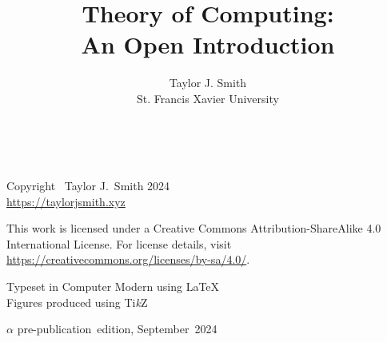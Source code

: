 \documentclass{book}
\title{Theory of Computing: \\ An Open Introduction}
\author{Taylor J. Smith \\ St. Francis Xavier University}
\date{\editionmonth\ \editionyear}
\newcommand{\editionnumber}{$\alpha$ pre-publication}
\newcommand{\editionyear}{2024}
\newcommand{\editionmonth}{September}
\newif\ifstyle
\newif\ifdraft
\newif\ifprint
\begin{document}
\pagestyle{empty}

\ifstyle
	\ifprint
	\else
	
	\cleardoublepage
	\fi
	
\else
	\maketitle
	\cleardoublepage
\fi


\ifstyle
	
\else
	\vspace*{\fill}
	\noindent
	Copyright \textcopyright\ Taylor J.\ Smith \editionyear \\
	\url{https://taylorjsmith.xyz} \par
	
	\noindent
	This work is licensed under a Creative Commons Attribution-ShareAlike 4.0 International License. For license details, visit \\ \url{https://creativecommons.org/licenses/by-sa/4.0/}. \par
	
	\noindent
	Typeset in Computer Modern using \LaTeX \\
	Figures produced using Ti\textit{k}Z \par
	
	\noindent
	\ifdraft
		\textbf{Draft} \editionnumber\ edition (\today) \par
	\else
		\editionnumber\ edition, \editionmonth\ \editionyear \par
	\fi
	\cleardoublepage
\fi


\clearpage

\ifstyle
	\pagestyle{fancy}
\else
	\pagestyle{plain}
\fi

\frontmatter

\tableofcontents




\mainmatter








\appendix


%



\backmatter

{}




\ifstyle
	\ifprint
	\else
	
	\fi
\else
\fi
\end{document}
